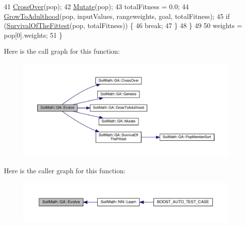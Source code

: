 \begin{DoxyCode}
41     \hyperlink{class_soil_math_1_1_g_a_abf408d603b2afb188a6d265eb6309b69}{CrossOver}(pop);
42     \hyperlink{class_soil_math_1_1_g_a_a489f2afd54086c14f45b654aeec0fe3c}{Mutate}(pop);
43     totalFitness = 0.0;
44     \hyperlink{class_soil_math_1_1_g_a_aff791f50f889beb74e854942f8883b58}{GrowToAdulthood}(pop, inputValues, rangeweights, goal, totalFitness);
45     \textcolor{keywordflow}{if} (\hyperlink{class_soil_math_1_1_g_a_ac2c10631815408d044738f678c67e98b}{SurvivalOfTheFittest}(pop, totalFitness)) \{
46       \textcolor{keywordflow}{break};
47     \}
48   \}
49 
50   weights = pop[0].weights;
51 \}
\end{DoxyCode}


Here is the call graph for this function\+:\nopagebreak
\begin{figure}[H]
\begin{center}
\leavevmode
\includegraphics[width=350pt]{class_soil_math_1_1_g_a_a4290310d89064946c645673840591540_cgraph}
\end{center}
\end{figure}




Here is the caller graph for this function\+:\nopagebreak
\begin{figure}[H]
\begin{center}
\leavevmode
\includegraphics[width=350pt]{class_soil_math_1_1_g_a_a4290310d89064946c645673840591540_icgraph}
\end{center}
\end{figure}


\hypertarget{class_soil_math_1_1_g_a_aca448f36c1f98b4906d0754cf354cccf}{}

